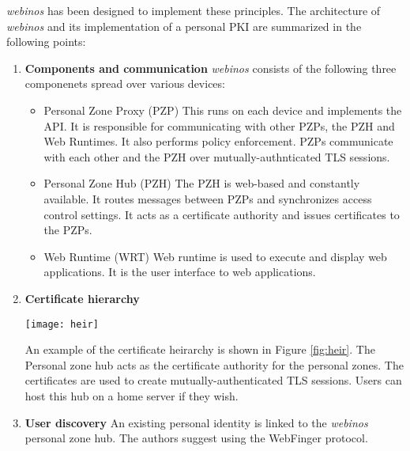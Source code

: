 \textit{webinos} has been designed to implement these principles. The architecture of \textit{webinos} and its implementation of a personal PKI are summarized in the following points:

\begin{enumerate}[label=\arabic*., wide, labelwidth=!, labelindent=0pt]
	\item \textbf{Components and communication} \textit{webinos} consists of the following three componenets spread over various devices:
	\begin{itemize}
			\item Personal Zone Proxy (PZP) This runs on each device and implements the API. It is responsible for communicating with other PZPs, 					the PZH and Web Runtimes. It also performs policy enforcement. PZPs communicate with each other and the PZH over mutually-authnticated 				TLS 	sessions.
			\item Personal Zone Hub (PZH) The PZH is web-based and constantly available. It routes messages between PZPs and synchronizes access 				control settings. It acts as a certificate authority and issues certificates to the PZPs.
			\item Web Runtime (WRT) Web runtime is used to execute and display web applications. It is the user interface to web applications.\\
	\end{itemize}
	

	\item \textbf{Certificate hierarchy}
		\begin{figure*}[!h]
			\centering
			\texttt{[image: heir]}
			\caption{Certificate heirarchy in \textit{webinos} \cite{Lyle2013}}
			\label{fig:heir}
		\end{figure*}
		An example of the certificate heirarchy is shown in Figure \ref{fig:heir}. The Personal zone hub acts as the certificate authority for the 					personal zones. The certificates are used to create mutually-authenticated TLS sessions. Users can host this hub on a home server if they 					wish.\\

	\item \textbf{User discovery} An existing personal identity is linked to the \textit{webinos} personal zone hub. The authors suggest using the 			WebFinger protocol\cite{Webfinger}.\\
	

\end{enumerate}
